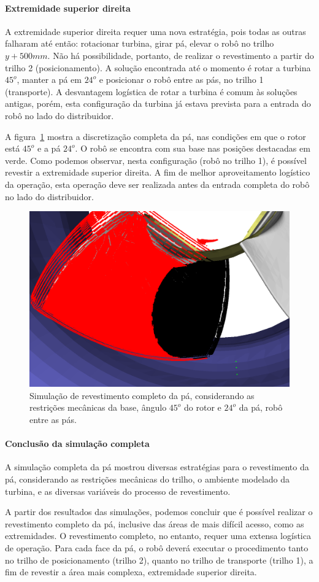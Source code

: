 \paragraph{Extremidade superior direita}
A extremidade superior direita requer uma nova estratégia, pois todas as
outras falharam até então: rotacionar turbina, girar pá, elevar o robô no trilho
$y+500 mm$. Não há possibilidade, portanto, de realizar o revestimento a partir
do trilho 2 (posicionamento). A solução encontrada até o momento é rotar a
turbina $45^o$, manter a pá em $24^o$ e posicionar o robô entre as pás, no
trilho 1 (transporte). A desvantagem logística de rotar a turbina é comum às
soluções antigas, porém, esta configuração da turbina já estava prevista para
a entrada do robô no lado do distribuidor.

A figura~\ref{fig::simcomp1_7} mostra a discretização completa da pá, nas
condições em que o rotor está $45^o$ e a pá $24^o$. O robô se encontra
com sua base nas posições destacadas em verde. Como podemos observar, nesta
configuração (robô no trilho 1), é possível revestir a extremidade
superior direita. A fim de melhor aproveitamento logístico da
operação, esta operação deve ser realizada antes da entrada completa
do robô no lado do distribuidor.

\begin{figure}[!ht]
	\centering	
	\includegraphics[width=0.7\columnwidth]{method/figs/simcomp1_7.png}
	\caption{Simulação de revestimento completo da pá, considerando as
	restrições mecânicas da base, ângulo $45^o$ do rotor e $24^o$ da pá, robô
	entre as pás.}
	\label{fig::simcomp1_7}
\end{figure}

\paragraph{Conclusão da simulação completa}

A simulação completa da pá mostrou diversas estratégias para o revestimento da
pá, considerando as restrições mecânicas do trilho, o ambiente modelado da
turbina, e as diversas variáveis do processo de revestimento.

A partir dos resultados das simulações, podemos concluir que é possível realizar
o revestimento completo da pá, inclusive das áreas de mais difícil acesso, como
as extremidades. O revestimento completo, no entanto, requer uma extensa
logística de operação. Para cada face da pá, o robô deverá executar o
procedimento tanto no trilho de posicionamento (trilho 2), quanto no trilho de
transporte (trilho 1), a fim de revestir a área mais complexa, extremidade
superior direita. 